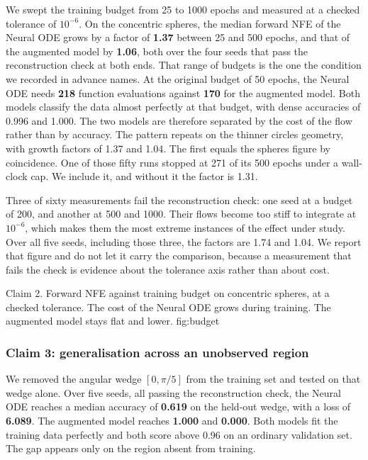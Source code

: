 We swept the training budget from 25 to 1000 epochs and measured at a checked tolerance of
$10^{-6}$. On the concentric spheres, the median forward NFE of the Neural ODE grows by a factor of
\textbf{1.37} between 25 and 500 epochs, and that of the augmented model by \textbf{1.06}, both
over the four seeds that pass the reconstruction check at both ends. That range of budgets is
the one the condition we recorded in advance names. At the original
budget of 50 epochs, the Neural ODE needs \textbf{218} function evaluations against
\textbf{170} for the augmented model. Both models classify the data almost perfectly at that
budget, with dense accuracies of 0.996 and 1.000. The two models are therefore separated by
the cost of the flow rather than by accuracy. The pattern repeats on the thinner circles geometry, with growth factors of 1.37 and 1.04. The
first equals the spheres figure by coincidence. One of those fifty runs stopped at 271 of its 500 epochs under a wall-clock cap. We include
it, and without it the factor is 1.31.

Three of sixty measurements fail the reconstruction check: one seed at a budget of 200, and
another at 500 and 1000. Their flows become too stiff to integrate at $10^{-6}$, which makes
them the most extreme instances of the effect under study. Over all five seeds, including those three, the factors are 1.74 and 1.04. We report that figure and do not let it carry the comparison, because a measurement that
fails the check is evidence about the tolerance axis rather than about cost.

  {Claim 2. Forward NFE against training budget on concentric spheres, at a checked tolerance.
   The cost of the Neural ODE grows during training. The augmented model stays flat and
   lower.}
  {fig:budget}

\subsubsection{Claim 3: generalisation across an unobserved region}

We removed the angular wedge $[0, \pi/5]$ from the training set and tested on that wedge
alone. Over five seeds, all passing the reconstruction check, the Neural ODE reaches a median
accuracy of \textbf{0.619} on the held-out wedge, with a loss of \textbf{6.089}. The augmented
model reaches \textbf{1.000} and \textbf{0.000}. Both models fit the training data perfectly
and both score above 0.96 on an ordinary validation set. The gap appears only on the region
absent from training.

